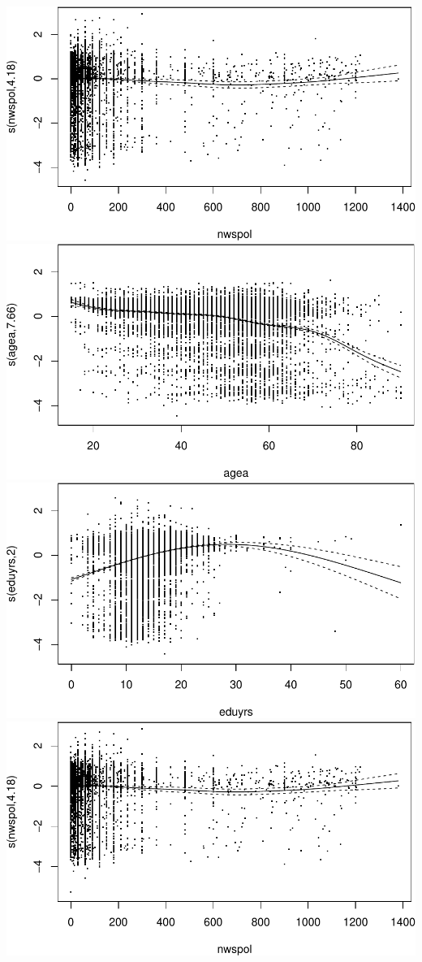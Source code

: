 \documentclass[
]{article}
\begin{document}
\includegraphics{ESS_DE_files/figure-latex/GAM-1.pdf}
\includegraphics{ESS_DE_files/figure-latex/GAM-2.pdf}
\includegraphics{ESS_DE_files/figure-latex/GAM-3.pdf}
\includegraphics{ESS_DE_files/figure-latex/unnamed-chunk-8-1.pdf}
\end{document}
